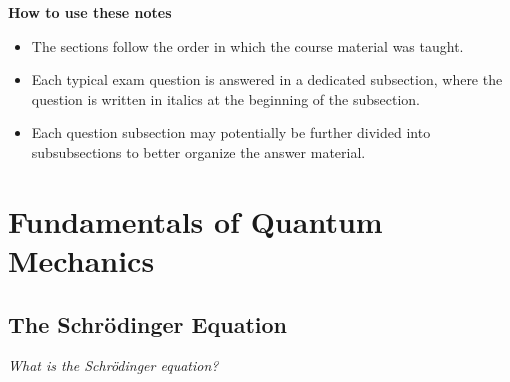 \documentclass[11pt, a4paper]{article}
\newcommand{\Schro}{Schr\"{o}dinger\xspace}
\begin{document}
\vspace{5mm}
\textbf{How to use these notes}
\begin{itemize}
    \item The sections follow the order in which the course material was taught.

    \item Each typical exam question is answered in a dedicated subsection, where the question is written in italics at the beginning of the subsection.
    
    \item Each question subsection may potentially be further divided into subsubsections to better organize the answer material.

\end{itemize}

\newpage

\pagestyle{empty}  %
\tableofcontents

\newpage

\pagestyle{fancy}  %

\section{Fundamentals of Quantum Mechanics}
\subsection{The \Schro Equation}
\textit{What is the \Schro equation? }
\end{document}
